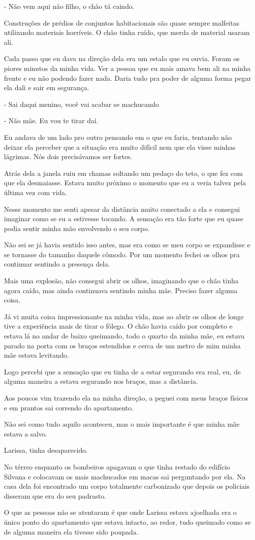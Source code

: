 - Não vem aqui não filho, o chão tá caindo.

Construções de prédios de conjuntos habitacionais são quase sempre malfeitas utilizando materiais horríveis. O chão tinha ruído, que merda de material usaram ali.

Cada passo que eu dava na direção dela era um estalo que eu ouvia. Foram os piores minutos da minha vida. Ver a pessoa que eu mais amava bem ali na minha frente e eu não podendo fazer nada. Daria tudo pra poder de alguma forma pegar ela dali e sair em segurança.

- Sai daqui menino, você vai acabar se machucando

- Não mãe. Eu vou te tirar daí.

Eu andava de um lado pro outro pensando em o que eu faria, tentando não deixar ela perceber que a situação era muito difícil nem que ela visse minhas lágrimas. Nós dois precisávamos ser fortes.

Atrás dela a janela ruiu em chamas soltando um pedaço do teto, o que fez com que ela desmaiasse. Estava muito próximo o momento que eu a veria talvez pela última vez com vida.

Nesse momento me senti apesar da distância muito conectado a ela e consegui imaginar como se eu a estivesse tocando. A sensação era tão forte que eu quase podia sentir minha mão envolvendo o seu corpo.

Não sei se já havia sentido isso antes, mas era como se meu corpo se expandisse e se tornasse do tamanho daquele cômodo. Por um momento fechei os olhos pra continuar sentindo a presença dela.

Mais uma explosão, não consegui abrir os olhos, imaginando que o chão tinha agora caído, mas ainda continuava sentindo minha mãe. Preciso fazer alguma coisa.

Já vi muita coisa impressionante na minha vida, mas ao abrir os olhos de longe tive a experiência mais de tirar o fôlego. O chão havia caído por completo e estava lá no andar de baixo queimando, todo o quarto da minha mãe, eu estava parado na porta com os braços estendidos e cerca de um metro de mim minha mãe estava levitando.

Logo percebi que a sensação que eu tinha de a estar segurando era real, eu, de alguma maneira a estava segurando nos braços, mas a distância.

Aos poucos vim trazendo ela na minha direção, a peguei com meus braços físicos e em prantos sai correndo do apartamento.

Não sei como tudo aquilo aconteceu, mas o mais importante é que minha mãe estava a salvo.

Larissa, tinha desaparecido.

No térreo enquanto os bombeiros apagavam o que tinha restado do edifício Silvana e colocavam os mais machucados em macas sai perguntando por ela. Na casa dela foi encontrado um corpo totalmente carbonizado que depois os policiais disseram que era do seu padrasto.

O que as pessoas não se atentaram é que onde Larissa estava ajoelhada era o único ponto do apartamento que estava intacto, ao redor, tudo queimado como se de alguma maneira ela tivesse sido poupada.



